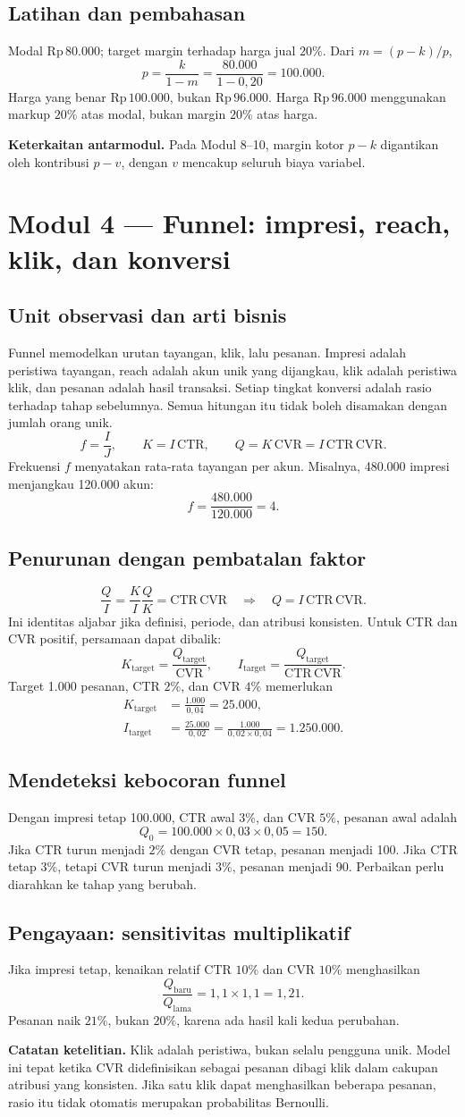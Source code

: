 \documentclass[11pt,a4paper]{article}
\newcommand{\modul}[2]{\clearpage\section{Modul #1 --- #2}}
\newcommand{\bagian}[1]{\Needspace{5\baselineskip}\subsection{#1}}
\newcommand{\catatan}[1]{\par\textbf{Catatan ketelitian.} #1\par}
\newcommand{\jembatan}[1]{\par\textbf{Keterkaitan antarmodul.} #1\par}
\newcommand{\CTR}{\mathrm{CTR}}
\newcommand{\CVR}{\mathrm{CVR}}
\newcommand{\rp}[1]{\ensuremath{\mathrm{Rp}\,#1}}
\begin{document}
\bagian{Latihan dan pembahasan}
Modal \rp{80.000}; target margin terhadap harga jual \(20\%\). Dari \(m=(p-k)/p\),
\[
p=\frac{k}{1-m}=\frac{80.000}{1-0{,}20}=100.000.
\]
Harga yang benar \rp{100.000}, bukan \rp{96.000}. Harga \rp{96.000} menggunakan markup \(20\%\) atas modal, bukan margin \(20\%\) atas harga.
\jembatan{Pada Modul 8--10, margin kotor \(p-k\) digantikan oleh kontribusi \(p-v\), dengan \(v\) mencakup seluruh biaya variabel.}

\modul{4}{Funnel: impresi, reach, klik, dan konversi}
\bagian{Unit observasi dan arti bisnis}
Funnel memodelkan urutan tayangan, klik, lalu pesanan. Impresi adalah peristiwa tayangan, reach adalah akun unik yang dijangkau, klik adalah peristiwa klik, dan pesanan adalah hasil transaksi. Setiap tingkat konversi adalah rasio terhadap tahap sebelumnya. Semua hitungan itu tidak boleh disamakan dengan jumlah orang unik.
\[
f=\frac{I}{J},\qquad K=I\,\CTR,\qquad
Q=K\,\CVR=I\,\CTR\,\CVR.
\]
Frekuensi \(f\) menyatakan rata-rata tayangan per akun. Misalnya, 480.000 impresi menjangkau 120.000 akun:
\[
f=\frac{480.000}{120.000}=4.
\]

\bagian{Penurunan dengan pembatalan faktor}
\[
\frac{Q}{I}=\frac{K}{I}\frac{Q}{K}=\CTR\,\CVR
\quad\Longrightarrow\quad Q=I\,\CTR\,\CVR.
\]
Ini identitas aljabar jika definisi, periode, dan atribusi konsisten. Untuk CTR dan CVR positif, persamaan dapat dibalik:
\[
K_{\text{target}}=\frac{Q_{\text{target}}}{\CVR},\qquad
I_{\text{target}}=\frac{Q_{\text{target}}}{\CTR\,\CVR}.
\]
Target 1.000 pesanan, CTR \(2\%\), dan CVR \(4\%\) memerlukan
\[
\begin{aligned}
K_{\text{target}}&=\frac{1.000}{0{,}04}=25.000,\\
I_{\text{target}}&=\frac{25.000}{0{,}02}
=\frac{1.000}{0{,}02\times0{,}04}=1.250.000.
\end{aligned}
\]

\bagian{Mendeteksi kebocoran funnel}
Dengan impresi tetap 100.000, CTR awal \(3\%\), dan CVR \(5\%\), pesanan awal adalah
\[
Q_0=100.000\times0{,}03\times0{,}05=150.
\]
Jika CTR turun menjadi \(2\%\) dengan CVR tetap, pesanan menjadi 100. Jika CTR tetap \(3\%\), tetapi CVR turun menjadi \(3\%\), pesanan menjadi 90. Perbaikan perlu diarahkan ke tahap yang berubah.

\bagian{Pengayaan: sensitivitas multiplikatif}
Jika impresi tetap, kenaikan relatif CTR \(10\%\) dan CVR \(10\%\) menghasilkan
\[
\frac{Q_{\text{baru}}}{Q_{\text{lama}}}
=1{,}1\times1{,}1=1{,}21.
\]
Pesanan naik \(21\%\), bukan \(20\%\), karena ada hasil kali kedua perubahan.
\catatan{Klik adalah peristiwa, bukan selalu pengguna unik. Model ini tepat ketika CVR didefinisikan sebagai pesanan dibagi klik dalam cakupan atribusi yang konsisten. Jika satu klik dapat menghasilkan beberapa pesanan, rasio itu tidak otomatis merupakan probabilitas Bernoulli.}
\end{document}
